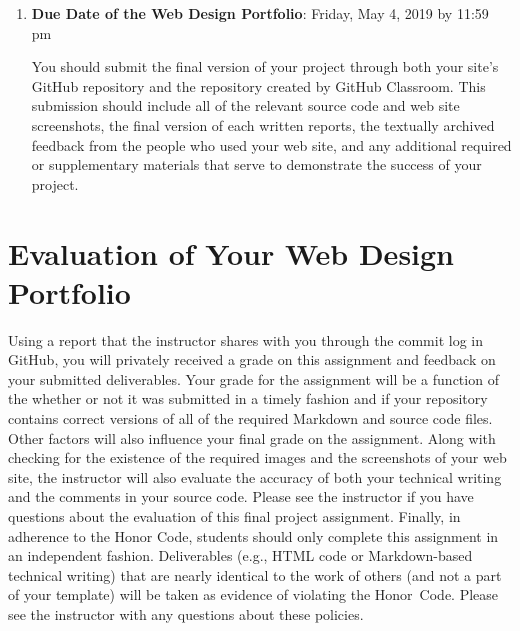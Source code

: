 \documentclass[11pt]{article}
\begin{document}
\begin{enumerate}
  \item {\bf Due Date of the Web Design Portfolio}: Friday, May 4, 2019 by 11:59
    pm

    You should submit the final version of your project through both your site's
    GitHub repository and the repository created by GitHub Classroom. This
    submission should include all of the relevant source code and web site
    screenshots, the final version of each written reports, the textually
    archived feedback from the people who used your web site, and any additional
    required or supplementary materials that serve to demonstrate the success of
    your project.

\end{enumerate}

\vspace*{-.1in}

\section*{Evaluation of Your Web Design Portfolio}

Using a report that the instructor shares with you through the commit log in
GitHub, you will privately received a grade on this assignment and feedback on
your submitted deliverables. Your grade for the assignment will be a function of
the whether or not it was submitted in a timely fashion and if your repository
contains correct versions of all of the required Markdown and source code files.
Other factors will also influence your final grade on the assignment. Along with
checking for the existence of the required images and the screenshots of your
web site, the instructor will also evaluate the accuracy of both your technical
writing and the comments in your source code. Please see the instructor if you
have questions about the evaluation of this final project assignment.
%
Finally, in adherence to the Honor Code, students should only complete this
assignment in an independent fashion. Deliverables (e.g., HTML code or
Markdown-based technical writing) that are nearly identical to the work of
others (and not a part of your template) will be taken as evidence of violating
the \mbox{Honor Code}. Please see the instructor with any questions about these
policies.
\end{document}
